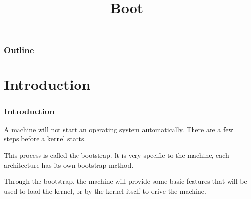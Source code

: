 %
%
%
%
%
%

%
%

%
%

\def\path{../../../..}

%
%



%
%

\title{Boot}

%
%



%
%

\begin{frame}
  \titlepage
\end{frame}

%
%

\begin{frame}
  \frametitle{Outline}

  \tableofcontents
\end{frame}

%
%

%
%

\section{Introduction}

\begin{frame}
  \frametitle{Introduction}

  A machine will not start an operating system automatically. There are a few steps before a kernel starts.

  \-

  This process is called the bootstrap. It is very specific to the machine, each architecture has its own bootstrap method.

  \-

  Through the bootstrap, the machine will provide some basic features that will be used to load the kernel, or by the kernel itself to drive the machine.

\end{frame}

